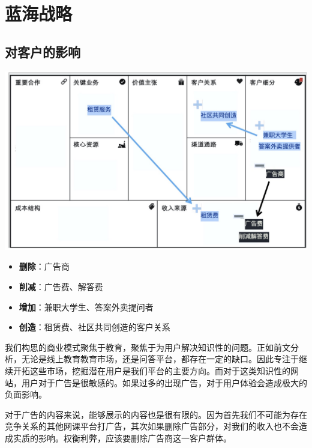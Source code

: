 \documentclass[a4paper]{ctexart}
\begin{document}

\FloatBarrier
\section{蓝海战略}
\subsection{对客户的影响}
\begin{center}
  \includegraphics[scale=0.3]{客户影响.png}
\end{center}

\begin{itemize}
  \item \textbf{删除}：广告商
  \item \textbf{削减}：广告费、解答费
  \item \textbf{增加}：兼职大学生、答案外卖提问者
  \item \textbf{创造}：租赁费、社区共同创造的客户关系
\end{itemize}


我们构思的商业模式聚焦于教育，聚焦于为用户解决知识性的问题。正如前文分析，无论是线上教育教育市场，还是问答平台，都存在一定的缺口。因此专注于继续开拓这些市场，挖掘潜在用户是我们平台的主要方向。而对于这类知识性的网站，用户对于广告是很敏感的。如果过多的出现广告，对于用户体验会造成极大的负面影响。

对于广告的内容来说，能够展示的内容也是很有限的。因为首先我们不可能为存在竞争关系的其他网课平台打广告，其次如果删除广告部分，对我们的收入也不会造成实质的影响。权衡利弊，应该要删除广告商这一客户群体。
\end{document}
